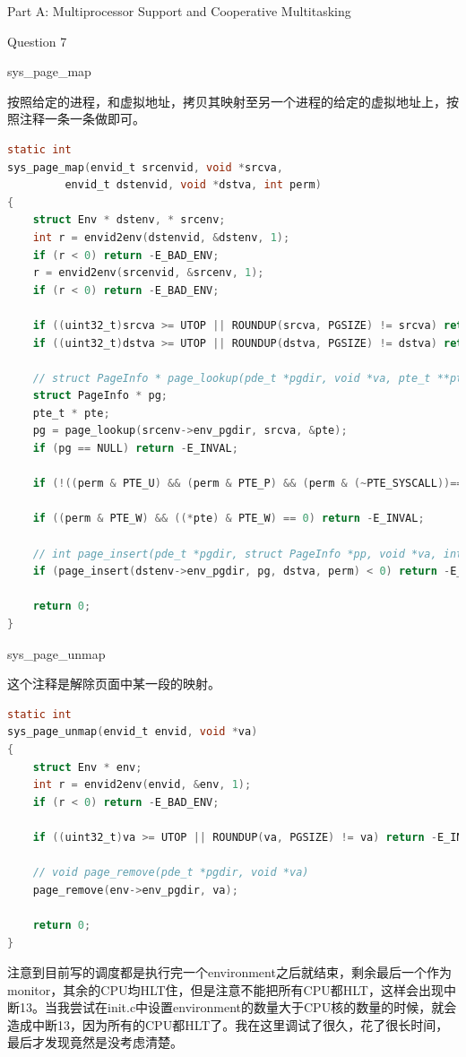 \documentclass[GBK,winfonts,a4paper,10pt]{ctexart}
\begin{document}
\begin{section}{Part A: Multiprocessor Support and Cooperative Multitasking}
\begin{subsection}{Question 7}
\begin{subsubsection}{sys\_page\_map}
\par
按照给定的进程，和虚拟地址，拷贝其映射至另一个进程的给定的虚拟地址上，按照注释一条一条做即可。
\begin{lstlisting}[language=C]
static int
sys_page_map(envid_t srcenvid, void *srcva,
	     envid_t dstenvid, void *dstva, int perm)
{
	struct Env * dstenv, * srcenv;
	int r = envid2env(dstenvid, &dstenv, 1);
	if (r < 0) return -E_BAD_ENV;
	r = envid2env(srcenvid, &srcenv, 1);
	if (r < 0) return -E_BAD_ENV;

	if ((uint32_t)srcva >= UTOP || ROUNDUP(srcva, PGSIZE) != srcva) return -E_INVAL;
	if ((uint32_t)dstva >= UTOP || ROUNDUP(dstva, PGSIZE) != dstva) return -E_INVAL;

	// struct PageInfo * page_lookup(pde_t *pgdir, void *va, pte_t **pte_store)
	struct PageInfo * pg;
	pte_t * pte;
	pg = page_lookup(srcenv->env_pgdir, srcva, &pte);
	if (pg == NULL) return -E_INVAL;		

	if (!((perm & PTE_U) && (perm & PTE_P) && (perm & (~PTE_SYSCALL))==0)) return -E_INVAL;
	
	if ((perm & PTE_W) && ((*pte) & PTE_W) == 0) return -E_INVAL;

	// int page_insert(pde_t *pgdir, struct PageInfo *pp, void *va, int perm)
	if (page_insert(dstenv->env_pgdir, pg, dstva, perm) < 0) return -E_NO_MEM;

	return 0;
}
\end{lstlisting}
\end{subsubsection}

\begin{subsubsection}{sys\_page\_unmap}
\par
这个注释是解除页面中某一段的映射。
\begin{lstlisting}[language=C]
static int
sys_page_unmap(envid_t envid, void *va)
{
	struct Env * env;
	int r = envid2env(envid, &env, 1);
	if (r < 0) return -E_BAD_ENV;

	if ((uint32_t)va >= UTOP || ROUNDUP(va, PGSIZE) != va) return -E_INVAL;
	
	// void page_remove(pde_t *pgdir, void *va)
	page_remove(env->env_pgdir, va);

	return 0;
}
\end{lstlisting}	
\end{subsubsection}

\par
注意到目前写的调度都是执行完一个environment之后就结束，剩余最后一个作为monitor，其余的CPU均HLT住，但是注意不能把所有CPU都HLT，这样会出现中断13。当我尝试在init.c中设置environment的数量大于CPU核的数量的时候，就会造成中断13，因为所有的CPU都HLT了。我在这里调试了很久，花了很长时间，最后才发现竟然是没考虑清楚。
\end{subsection}

\end{section}
\end{document}
